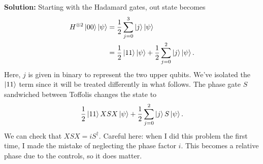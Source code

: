 \documentclass{book}
\begin{document}
    \textbf{Solution:} Starting with the Hadamard gates, out state becomes
    \begin{align}
    \begin{aligned}
        H^{\otimes 2}\ket{00}\ket{\psi} &=\frac{1}{2} \sum_{j=0}^3 \ket{j} \ket{\psi} \\
        &=\frac{1}{2}\ket{11}\ket{\psi} + \frac{1}{2}\sum_{j=0}^2 \ket{j}\ket{\psi}.
    \end{aligned}
    \end{align}
    Here, $j$ is given in binary to represent the two upper qubits. We've isolated the $\ket{11}$ term since it will be treated differently in what follows. The phase gate $S$ sandwiched between Toffolis changes the state to
    \begin{align} \label{eq:4.41_toffs}
    \begin{aligned}
        \frac{1}{2}\ket{11}XSX\ket{\psi} + \frac{1}{2}\sum_{j=0}^2 \ket{j}S\ket{\psi}.
    \end{aligned}
    \end{align}
    We can check that $XSX = i S^\dagger$. Careful here: when I did this problem the first time, I made the mistake of neglecting the phase factor $i$. This becomes a relative phase due to the controls, so it does matter.
\end{document}
